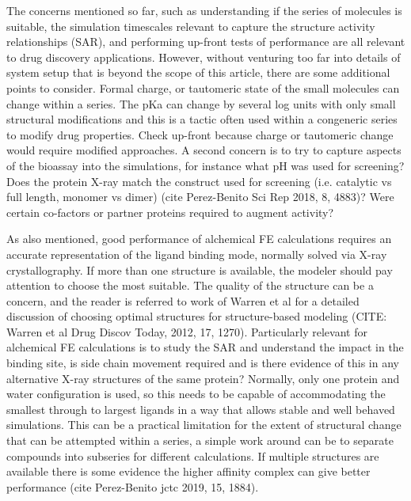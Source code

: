 \documentclass[9pt,bestpractices]{livecoms}
\begin{document}
The concerns mentioned so far, such as understanding if the series of molecules is suitable, the simulation timescales relevant to capture the structure activity relationships (SAR), and performing up-front tests of performance are all relevant to drug discovery applications. However, without venturing too far into details of system setup that is beyond the scope of this article, there are some additional points to consider. Formal charge, or tautomeric state of the small molecules can change within a series. The pKa can change by several log units with only small structural modifications and this is a tactic often used within a congeneric series to modify drug properties. Check up-front because charge or tautomeric change would require modified approaches. A second concern is to try to capture aspects of the bioassay into the simulations, for instance what pH was used for screening? Does the protein X-ray match the construct used for screening (i.e. catalytic vs full length, monomer vs dimer) (cite Perez-Benito Sci Rep 2018, 8, 4883)? Were certain co-factors or partner proteins required to augment activity? 
%

As also mentioned, good performance of alchemical FE calculations requires an accurate representation of the ligand binding mode, normally solved via X-ray crystallography. If more than one structure is available, the modeler should pay attention to choose the most suitable. The quality of the structure can be a concern, and the reader is referred to work of Warren et al for a detailed discussion of choosing optimal structures for structure-based modeling (CITE: Warren et al Drug Discov Today, 2012, 17, 1270). Particularly relevant for alchemical FE calculations is to study the SAR and understand the impact in the binding site, is side chain movement required and is there evidence of this in any alternative X-ray structures of the same protein? Normally, only one protein and water configuration is used, so this needs to be capable of accommodating the smallest through to largest ligands in a way that allows stable and well behaved simulations. This can be a practical limitation for the extent of structural change that can be attempted within a series, a simple work around can be to separate compounds into subseries for different calculations. If multiple structures are available there is some evidence the higher affinity complex can give better performance (cite Perez-Benito jctc 2019, 15, 1884). 
%
\end{document}
